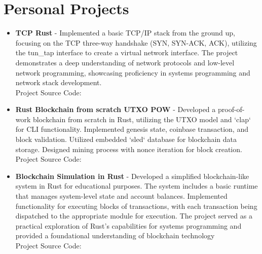 \documentclass[11pt,a4paper,sans]{moderncv}
\begin{document}
\section{Personal Projects}
\begin{itemize}[label=\textbullet]
  \item \textbf{TCP Rust} - Implemented a basic TCP/IP stack from the
    ground up, focusing on the TCP three-way handshake (SYN, SYN-ACK,
    ACK), utilizing the tun\_tap interface to create a virtual
    network interface. The project demonstrates a deep understanding
    of network protocols and low-level network programming,
    showcasing proficiency in systems programming and network stack
    development. \\
    Project Source Code:
    \textcolor{blue}
    {\href{https://github.com/noormohammedb/rust-tcp-implementation/}
      {}}

  \item \textbf{Rust Blockchain from scratch UTXO POW} - Developed a
    proof-of-work blockchain from scratch in Rust, utilizing the UTXO
    model and `clap` for CLI functionality. Implemented genesis
    state, coinbase transaction, and block validation. Utilized
    embedded `sled` database for blockchain data storage. Designed
    mining process with nonce iteration for block creation. \\
    Project Source Code:
    \textcolor{blue}
    {
      \href{
        https://github.com/noormohammedb/blockchain-pow-from-scratch-rust-utxo/
      }
      {
      }
    }

  \item \textbf{Blockchain Simulation in Rust} - Developed a
    simplified blockchain-like system in Rust for educational
    purposes. The system includes a basic runtime that manages
    system-level state and account balances. Implemented
    functionality for executing blocks of transactions, with each
    transaction being dispatched to the appropriate module for
    execution. The project served as a practical exploration of
    Rust’s capabilities for systems programming and provided a
    foundational understanding of blockchain technology  \\
    Project Source Code:
    \textcolor{blue}{
      \href{https://github.com/noormohammedb/rust-state-machine/}{}
    }

\end{itemize}
\end{document}
